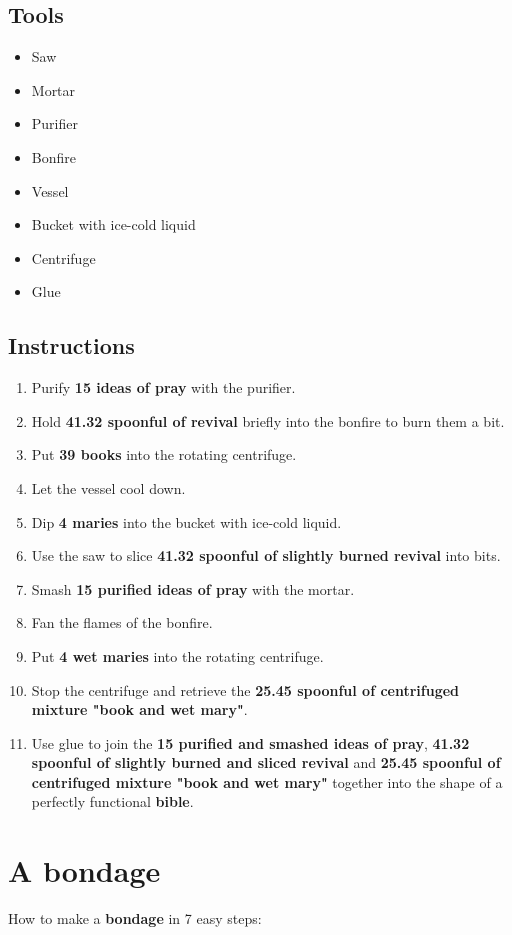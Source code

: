 \documentclass{article}
\begin{document}
\subsection{Tools}\begin{itemize}
\item 
Saw
\item 
Mortar
\item 
Purifier
\item 
Bonfire
\item 
Vessel
\item 
Bucket with ice-cold liquid
\item 
Centrifuge
\item 
Glue
\end{itemize}
\subsection{Instructions}\begin{enumerate}
\item 
Purify \textbf{15 ideas of pray} with the purifier.
\item 
Hold \textbf{41.32 spoonful of revival} briefly into the bonfire to burn them a bit.
\item 
Put \textbf{39 books} into the rotating centrifuge.
\item 
Let the vessel cool down.
\item 
Dip \textbf{4 maries} into the bucket with ice-cold liquid.
\item 
Use the saw to slice \textbf{41.32 spoonful of slightly burned revival} into bits.
\item 
Smash \textbf{15 purified ideas of pray} with the mortar.
\item 
Fan the flames of the bonfire.
\item 
Put \textbf{4 wet maries} into the rotating centrifuge.
\item 
Stop the centrifuge and retrieve the \textbf{25.45 spoonful of centrifuged mixture "book and wet mary"}.
\item 
Use glue to join the \textbf{15 purified and smashed ideas of pray}, \textbf{41.32 spoonful of slightly burned and sliced revival} and \textbf{25.45 spoonful of centrifuged mixture "book and wet mary"} together into the shape of a perfectly functional \textbf{bible}.
\end{enumerate}
\newpage
\section{A bondage}How to make a \textbf{bondage} in 7 easy steps:
\end{document}
